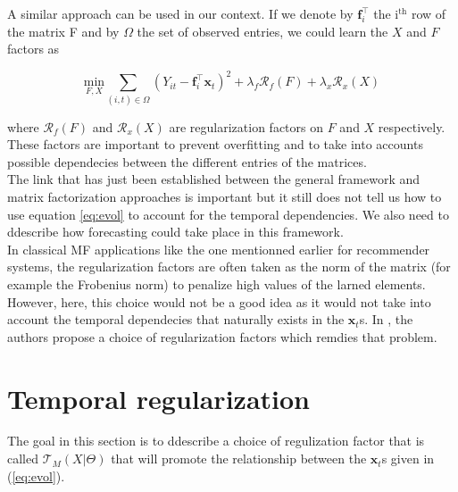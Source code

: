 \documentclass{article}
\begin{document}
A similar approach can be used in our context. If we denote by $\mathbf{f}_i^\top$ the i$^\text{th}$ row of the matrix F and by $\Omega$ the set of observed entries, we could learn the $X$ and $F$ factors as

$$\underset{F,X}{\text{min}} \sum_{(i,t) \in \Omega} (Y_{it} - \mathbf{f}_i^\top\mathbf{x}_t)^2 + \lambda_f \mathcal{R}_f(F) + \lambda_x \mathcal{R}_x(X)$$

where $\mathcal{R}_f(F)$ and $\mathcal{R}_x(X)$ are regularization factors on $F$ and $X$ respectively. These factors are important to prevent overfitting and to take into accounts possible dependecies between the different entries of the matrices. \\
The link that has just been established between the general framework and matrix factorization approaches is important but it still does not tell us how to use equation \ref{eq:evol} to account for the temporal dependencies. We also need to ddescribe how forecasting could take place in this framework. \\
In classical MF applications like the one mentionned earlier for recommender systems, the regularization factors are often taken as the norm of the matrix (for example the Frobenius norm) to penalize high values of the larned elements. However, here, this choice would not be a good idea as it would not take into account the temporal dependecies that naturally exists in the $\mathbf{x}_t$s. In \cite{TRMF}, the authors propose a choice of regularization factors which remdies that problem.

\section{Temporal regularization}

The goal in this section is to ddescribe a choice of regulization factor that is called $\mathcal{T}_M(X | \Theta)$ that will promote the relationship between the $\mathbf{x}_t$s given in (\ref{eq:evol}). 



\end{document}
